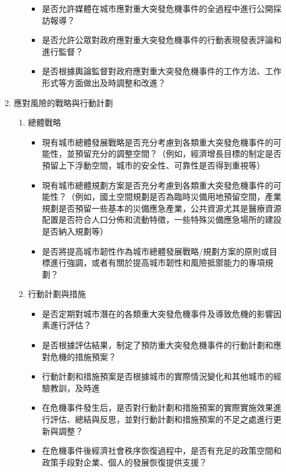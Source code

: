 \documentclass[a4paper,12pt]{article}
\begin{document}
\begin{enumerate}
\begin{enumerate}
\begin{enumerate}
\begin{itemize}
\item 是否允許媒體在城市應對重大突發危機事件的全過程中進行公開採訪報導？\\
\item 是否允許公眾對政府應對重大突發危機事件的行動表現發表評論和進行監督？\\
\item 是否根據輿論監督對政府應對重大突發危機事件的工作方法、工作形式等方面做出及時調整和改進？\\
\end{itemize}
\end{enumerate}
\item 應對風險的戰略與行動計劃
\label{sec:orge5203fd}
\begin{enumerate}
\item 總體戰略
\label{sec:org2595af4}
\begin{itemize}
\item 現有城市總體發展戰略是否充分考慮到各類重大突發危機事件的可能性，並預留充分的調整空間？（例如，經濟增長目標的制定是否預留上下浮動空間，城市的安全性、可靠性是否得到重視等）\\
\item 現有城市總體規劃方案是否充分考慮到各類重大突發危機事件的可能性？（例如，國土空間規劃是否為臨時災備用地預留空間，產業規劃是否預留一些基本的災備應急產業，公共資源尤其是醫療資源配置是否符合人口分佈和流動特徵，一些特殊災備應急場所的建設是否納入規劃等）\\
\item 是否將提高城市韌性作為城市總體發展戰略/規劃方案的原則或目標進行強調，或者有關於提高城市韌性和風險抵禦能力的專項規劃？\\
\end{itemize}
\item 行動計劃與措施
\label{sec:orgbacff27}
\begin{itemize}
\item 是否定期對城市潛在的各類重大突發危機事件及導致危機的影響因素進行評估？\\
\item 是否根據評估結果，制定了預防重大突發危機事件的行動計劃和應對危機的措施預案？\\
\item 行動計劃和措施預案是否根據城市的實際情況變化和其他城市的經驗教訓，及時進\\
\item 在危機事件發生后，是否對行動計劃和措施預案的實際實施效果進行評估、總結與反思，並對行動計劃和措施預案的不足之處進行更新與調整？\\
\item 在危機事件後經濟社會秩序恢復過程中，是否有充足的政策空間和政策手段對企業、個人的發展恢復提供支援？\\

\end{itemize}
\end{enumerate}
\end{enumerate}
\end{enumerate}
\end{document}
